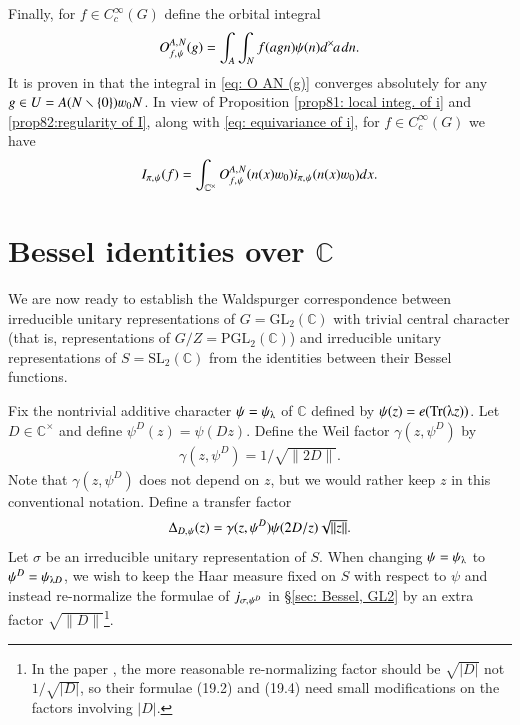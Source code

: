 \documentclass{amsproc}
\newcommand{\BC}{{\mathbb {C}}} \newcommand{\BD}{{\mathbb {D}}}
\newcommand{\GL}{{\mathrm {GL}}} \newcommand{\PGL}{{\mathrm {PGL}}}
\newcommand{\SL}{{\mathrm {SL}}} \newcommand{\PSL}{{\mathrm {PSL}}}
\def\BCx{\BC^{\times}}
\def\shskip{\hskip 0.5 pt}
\def\dx{d^{\times} \hskip -1 pt}
\theoremstyle{plain}
\numberwithin{equation}{section}
\begin{document}
Finally, for $f \in C_c^{\infty} (G)$ define the orbital integral
\begin{align}\label{eq: O AN (g)}
O^{A, \shskip N}_{f, \shskip \psi} (g) = \int_A \int_N  f (a g  n) \psi (n) \dx a \hskip 1 pt d n.
\end{align}
It is proven in \cite{Jacquet-RTF} that the integral in \eqref{eq: O AN (g)}  converges absolutely for any $g \in U =  A (N \smallsetminus \{0\} ) \varw_0 N$. In view of Proposition \ref{prop81: local integ. of i} and \ref{prop82:regularity of I}, along with \eqref{eq: equivariance of i}, %
  for  $f \in C_c^{\infty} (G)$ we have
\begin{align}\label{eq: I = int O}
I_{\pi,\shskip \psi} (f) = \int_{ \BCx} O^{A, \shskip N}_{f, \shskip \psi} (n(x) \varw_0) i_{\pi,\shskip \psi} (n(x) \varw_0) d x.
\end{align}


	
	\section{Bessel identities over $\BC$}
	
	We are now ready to establish the Waldspurger correspondence between   irreducible unitary representations of $ G = \GL_2 (\BC) $ with   trivial central character (that is, representations of $  G/Z = \PGL_2 (\BC) $) and  irreducible unitary representations of $S = \SL_2 (\BC)$ from the identities between their Bessel functions.
	
	Fix the nontrivial additive character $ \psi = \psi_{\lambdaup}$ of $\BC$ defined by $\psi (z) = e (\Tr (\lambdaup z) )$. Let $D \in \BCx$ and define $ \psi^D (z) = \psi (D z)$. Define the Weil factor $\gamma (z, \psi^D) $ by
	\begin{align*}
	\gamma (z, \psi^D) = 1/{\textstyle \sqrt {\|2 D\|}} .
	\end{align*}
	Note that $ \gamma (z, \psi^D)$ does not depend on $z$, but we would rather keep $z$ in this conventional notation.
	Define a {transfer factor}
	\begin{align}
	\Delta_{D,\shskip \psi} (z) = \gamma (z, \psi^D) \psi (2D/ z) {\textstyle \sqrt {\|z\|} }.
	\end{align}
	Let $\sigma$ be an irreducible unitary representation of $S$.
	When changing $\psi = \psi_{\lambdaup}$ to $\psi^D = \psi_{\lambdaup D}$, we wish to keep the Haar measure fixed on $S$ with respect to $\psi  $ and instead re-normalize the formulae of $ j_{\sigma,\shskip \psi^D } $ in \S \ref{sec: Bessel, GL2} by an extra factor $   \sqrt {\|D\|} $\footnote{In the paper \cite{BaruchMao-Real}, the more reasonable re-normalizing factor should be $\sqrt {|D|}$ not $1/\sqrt {|D|}$, so their formulae (19.2) and (19.4) need small modifications on the factors involving $|D|$.}.
	
\end{document}
